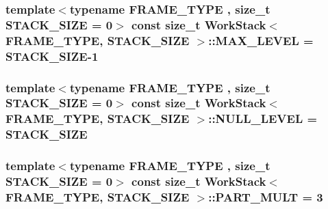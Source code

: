 \hypertarget{structWorkStack_a785256dcd178410e2ea2bf3ea595d87d}{
\subsubsection[{M\-A\-X\-\_\-\-L\-E\-V\-E\-L}]{\setlength{\rightskip}{0pt plus 5cm}template$<$typename F\-R\-A\-M\-E\-\_\-\-T\-Y\-P\-E , size\-\_\-t S\-T\-A\-C\-K\-\_\-\-S\-I\-Z\-E = 0$>$ const size\-\_\-t {\bf Work\-Stack}$<$ F\-R\-A\-M\-E\-\_\-\-T\-Y\-P\-E, S\-T\-A\-C\-K\-\_\-\-S\-I\-Z\-E $>$\-::M\-A\-X\-\_\-\-L\-E\-V\-E\-L = S\-T\-A\-C\-K\-\_\-\-S\-I\-Z\-E-\/1\hspace{0.3cm}{\ttfamily [static]}}}\label{structWorkStack_a785256dcd178410e2ea2bf3ea595d87d}
\hypertarget{structWorkStack_a5b5d945dac8430553d7b57dab4104f61}{
\subsubsection[{N\-U\-L\-L\-\_\-\-L\-E\-V\-E\-L}]{\setlength{\rightskip}{0pt plus 5cm}template$<$typename F\-R\-A\-M\-E\-\_\-\-T\-Y\-P\-E , size\-\_\-t S\-T\-A\-C\-K\-\_\-\-S\-I\-Z\-E = 0$>$ const size\-\_\-t {\bf Work\-Stack}$<$ F\-R\-A\-M\-E\-\_\-\-T\-Y\-P\-E, S\-T\-A\-C\-K\-\_\-\-S\-I\-Z\-E $>$\-::N\-U\-L\-L\-\_\-\-L\-E\-V\-E\-L = S\-T\-A\-C\-K\-\_\-\-S\-I\-Z\-E\hspace{0.3cm}{\ttfamily [static]}}}\label{structWorkStack_a5b5d945dac8430553d7b57dab4104f61}
\hypertarget{structWorkStack_ac6cc950caebc53a6a6312f7c436a5ad8}{
\subsubsection[{P\-A\-R\-T\-\_\-\-M\-U\-L\-T}]{\setlength{\rightskip}{0pt plus 5cm}template$<$typename F\-R\-A\-M\-E\-\_\-\-T\-Y\-P\-E , size\-\_\-t S\-T\-A\-C\-K\-\_\-\-S\-I\-Z\-E = 0$>$ const size\-\_\-t {\bf Work\-Stack}$<$ F\-R\-A\-M\-E\-\_\-\-T\-Y\-P\-E, S\-T\-A\-C\-K\-\_\-\-S\-I\-Z\-E $>$\-::P\-A\-R\-T\-\_\-\-M\-U\-L\-T = 3\hspace{0.3cm}{\ttfamily [static]}}}\label{structWorkStack_ac6cc950caebc53a6a6312f7c436a5ad8}
